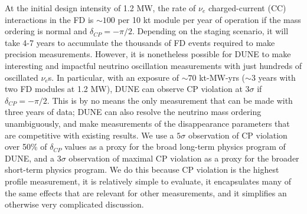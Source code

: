 \documentclass[11pt]{article}
\begin{document}
At the initial design intensity of 1.2 MW, the rate of $\nu_{e}$ charged-current (CC) interactions in the FD is $\sim 100$ per 10 kt module per year of operation if the mass ordering is normal and $\delta_{CP} = -\pi / 2$. Depending on the staging scenario, it will take 4-7 years to accumulate the thousands of FD events required to make precision measurements. However, it is nonetheless possible for DUNE to make interesting and impactful neutrino oscillation measurements with just hundreds of oscillated $\nu_{e}$s. In particular, with an exposure of $\sim 70$ kt-MW-yrs ($\sim 3$ years with two FD modules at 1.2 MW), DUNE can observe CP violation at $3 \sigma$ if $\delta_{CP} = -\pi / 2$. This is by no means the only measurement that can be made with three years of data; DUNE can also resolve the neutrino mass ordering unambiguously, and make measurements of the disappearance parameters that are competitive with existing results. We use a $5 \sigma$ observation of CP violation over 50\% of $\delta_{CP}$ values as a proxy for the broad long-term physics program of DUNE, and a $3 \sigma$ observation of maximal CP violation as a proxy for the broader short-term physics program. We do this because CP violation is the highest profile measurement, it is relatively simple to evaluate, it encapsulates many of the same effects that are relevant for other measurements, and it simplifies an otherwise very complicated discussion.
\end{document}

